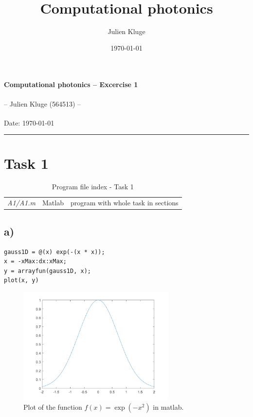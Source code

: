 \documentclass[12pt,a4paper]{article}
\title{Computational photonics}
\author{Julien Kluge}
\date{\today}
\begin{document}
\lstset{numbers=left}

\begin{center}
\large{\textbf{Computational photonics -- Excercise 1}} \\
~\\
\small{-- Julien Kluge (564513) --}\\
~\\
Date: \today
\end{center}
\hrule


\section*{Task 1}
	\begin{table}[H]
		\caption{Program file index - Task 1}
		\begin{tabular}{r|c|l}
			\textit{A1/A1.m} & Matlab & program with whole task in sections
		\end{tabular}
	\end{table}
	\subsection*{a)}
		\begin{lstlisting}
gauss1D = @(x) exp(-(x * x));
x = -xMax:dx:xMax;
y = arrayfun(gauss1D, x);
plot(x, y)
		\end{lstlisting}
		\begin{figure}[H]
			\centering
			\includegraphics[width=0.7\textwidth]{A1/A1_a.png}
			\caption{Plot of the function \(f(x)=\exp\left(-x^2\right)\) in matlab.}
		\end{figure}
\end{document}
